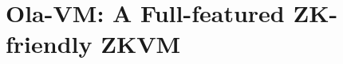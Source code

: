 \section{Ola-VM: A Full-featured ZK-friendly ZKVM}\label{sec:olavm-a-full-featured-zk-friendly-zkvm}





